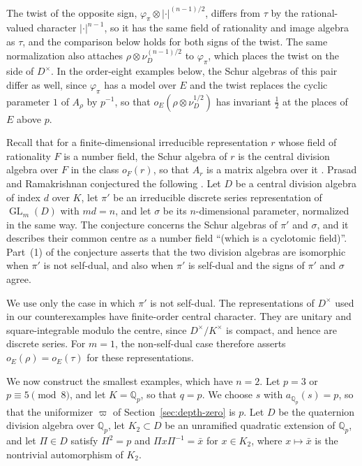 \documentclass[a4paper,11pt]{amsart}
\theoremstyle{definition}
\theoremstyle{remark}
\numberwithin{equation}{section}
\newcommand{\Q}{\mathbb{Q}}
\DeclareMathOperator{\GL}{GL}
\begin{document}
The twist of the opposite sign, $\varphi_\pi\otimes|\cdot|^{(n-1)/2}$, differs from $\tau$ by the rational-valued character $|\cdot|^{n-1}$, so it has the same field of rationality and image algebra as $\tau$, and the comparison below holds for both signs of the twist. The same normalization also attaches $\rho\otimes\nu_D^{(n-1)/2}$ to $\varphi_\pi$, which places the twist on the side of $D^\times$. In the order-eight examples below, the Schur algebras of this pair differ as well, since $\varphi_\pi$ has a model over $E$ and the twist replaces the cyclic parameter $1$ of $A_\rho$ by $p^{-1}$, so that $o_E(\rho\otimes\nu_D^{1/2})$ has invariant $\frac12$ at the places of $E$ above $p$.

Recall that for a finite-dimensional irreducible representation $r$ whose field of rationality $F$ is a number field, the Schur algebra of $r$ is the central division algebra over $F$ in the class $o_F(r)$, so that $A_r$ is a matrix algebra over it \cite[Lemma~3.0.7]{Su23}. Prasad and Ramakrishnan conjectured the following \cite[Conjecture~6.1]{PR12}. Let $D$ be a central division algebra of index $d$ over $K$, let $\pi'$ be an irreducible discrete series representation of $\GL_m(D)$ with $md=n$, and let $\sigma$ be its $n$-dimensional parameter, normalized in the same way. The conjecture concerns the Schur algebras of $\pi'$ and $\sigma$, and it describes their common centre as a number field ``(which is a cyclotomic field)''. Part~(1) of the conjecture asserts that the two division algebras are isomorphic when $\pi'$ is not self-dual, and also when $\pi'$ is self-dual and the signs of $\pi'$ and $\sigma$ agree.

We use only the case in which $\pi'$ is not self-dual. The representations of $D^\times$ used in our counterexamples have finite-order central character. They are unitary and square-integrable modulo the centre, since $D^\times/K^\times$ is compact, and hence are discrete series. For $m=1$, the non-self-dual case therefore asserts $o_E(\rho)=o_E(\tau)$ for these representations.

We now construct the smallest examples, which have $n=2$. Let $p=3$ or $p\equiv5\pmod8$, and let $K=\Q_p$, so that $q=p$. We choose $s$ with $a_{\Q_p}(s)=p$, so that the uniformizer $\varpi$ of Section~\ref{sec:depth-zero} is $p$. Let $D$ be the quaternion division algebra over $\Q_p$, let $K_2\subset D$ be an unramified quadratic extension of $\Q_p$, and let $\Pi\in D$ satisfy $\Pi^2=p$ and $\Pi x\Pi^{-1}=\bar x$ for $x\in K_2$, where $x\mapsto\bar x$ is the nontrivial automorphism of $K_2$.
\end{document}
